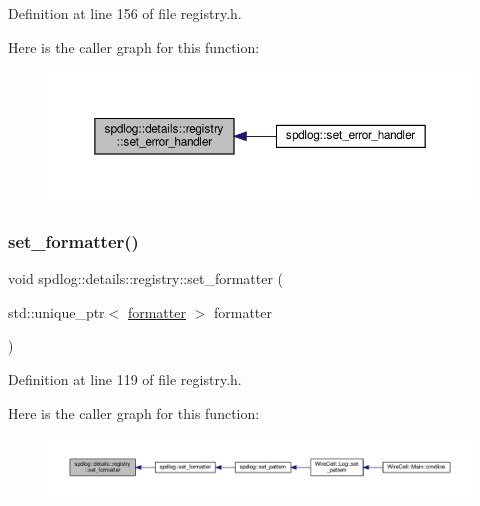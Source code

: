 Definition at line 156 of file registry.\+h.

Here is the caller graph for this function\+:
\nopagebreak
\begin{figure}[H]
\begin{center}
\leavevmode
\includegraphics[width=350pt]{classspdlog_1_1details_1_1registry_a47543b9b7ebe0dc3664cfd5f3e385905_icgraph}
\end{center}
\end{figure}
\mbox{\label{classspdlog_1_1details_1_1registry_a8f8dcb7f6b7987716cfbcb92bbe96517}} 
\subsubsection{\texorpdfstring{set\+\_\+formatter()}{set\_formatter()}}
{\footnotesize\ttfamily void spdlog\+::details\+::registry\+::set\+\_\+formatter (\begin{DoxyParamCaption}\item[{std\+::unique\+\_\+ptr$<$ \hyperlink{classspdlog_1_1formatter}{formatter} $>$}]{formatter }\end{DoxyParamCaption})\hspace{0.3cm}{\ttfamily [inline]}}



Definition at line 119 of file registry.\+h.

Here is the caller graph for this function\+:
\nopagebreak
\begin{figure}[H]
\begin{center}
\leavevmode
\includegraphics[width=350pt]{classspdlog_1_1details_1_1registry_a8f8dcb7f6b7987716cfbcb92bbe96517_icgraph}
\end{center}
\end{figure}
\mbox{\label{classspdlog_1_1details_1_1registry_a4b8494e781ed3151586b307cca63edb7}} 
